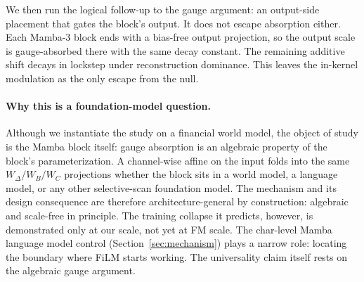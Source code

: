 \documentclass{article}
\begin{document}
We then run the logical follow-up to the gauge argument: an output-side placement that gates the block's output. It does not escape absorption either. Each Mamba-3 block ends with a bias-free output projection, so the output scale is gauge-absorbed there with the same decay constant. The remaining additive shift decays in lockstep under reconstruction dominance. This leaves the in-kernel modulation as the only escape from the null.

\paragraph{Why this is a foundation-model question.} Although we instantiate the study on a financial world model, the object of study is the Mamba block itself: gauge absorption is an algebraic property of the block's parameterization. A channel-wise affine on the input folds into the same $W_\Delta/W_B/W_C$ projections whether the block sits in a world model, a language model, or any other selective-scan foundation model. The mechanism and its design consequence are therefore architecture-general by construction: algebraic and scale-free in principle. The training collapse it predicts, however, is demonstrated only at our scale, not yet at FM scale. The char-level Mamba language model control (Section~\ref{sec:mechanism}) plays a narrow role: locating the boundary where FiLM starts working. The universality claim itself rests on the algebraic gauge argument.
\end{document}
